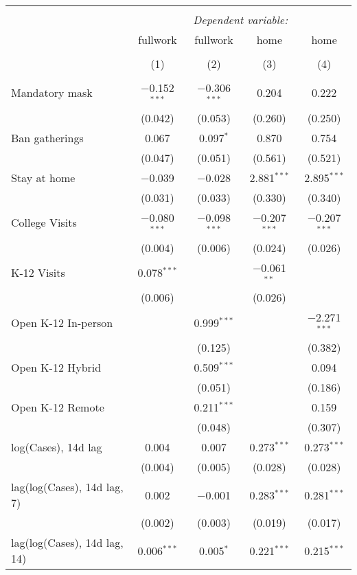\begin{tabular}{@{\extracolsep{1pt}}lcccc} 
\\[-1.8ex]\hline 
\hline \\[-1.8ex] 
 & \multicolumn{4}{c}{\textit{Dependent variable:}} \\ 
\cline{2-5} 
 & fullwork & fullwork & home & home \\ 
\\[-1.8ex] & (1) & (2) & (3) & (4)\\ 
\hline \\[-1.8ex] 
 Mandatory mask & $-$0.152$^{***}$ & $-$0.306$^{***}$ & 0.204 & 0.222 \\ 
  & (0.042) & (0.053) & (0.260) & (0.250) \\ 
  Ban gatherings & 0.067 & 0.097$^{*}$ & 0.870 & 0.754 \\ 
  & (0.047) & (0.051) & (0.561) & (0.521) \\ 
  Stay at home & $-$0.039 & $-$0.028 & 2.881$^{***}$ & 2.895$^{***}$ \\ 
  & (0.031) & (0.033) & (0.330) & (0.340) \\ 
  College Visits & $-$0.080$^{***}$ & $-$0.098$^{***}$ & $-$0.207$^{***}$ & $-$0.207$^{***}$ \\ 
  & (0.004) & (0.006) & (0.024) & (0.026) \\ 
  K-12 Visits & 0.078$^{***}$ &  & $-$0.061$^{**}$ &  \\ 
  & (0.006) &  & (0.026) &  \\ 
  Open K-12 In-person &  & 0.999$^{***}$ &  & $-$2.271$^{***}$ \\ 
  &  & (0.125) &  & (0.382) \\ 
  Open K-12 Hybrid &  & 0.509$^{***}$ &  & 0.094 \\ 
  &  & (0.051) &  & (0.186) \\ 
  Open K-12 Remote &  & 0.211$^{***}$ &  & 0.159 \\ 
  &  & (0.048) &  & (0.307) \\ 
  log(Cases), 14d lag & 0.004 & 0.007 & 0.273$^{***}$ & 0.273$^{***}$ \\ 
  & (0.004) & (0.005) & (0.028) & (0.028) \\ 
  lag(log(Cases), 14d lag, 7) & 0.002 & $-$0.001 & 0.283$^{***}$ & 0.281$^{***}$ \\ 
  & (0.002) & (0.003) & (0.019) & (0.017) \\ 
  lag(log(Cases), 14d lag, 14) & 0.006$^{***}$ & 0.005$^{*}$ & 0.221$^{***}$ & 0.215$^{***}$ \\ 

\end{tabular}
